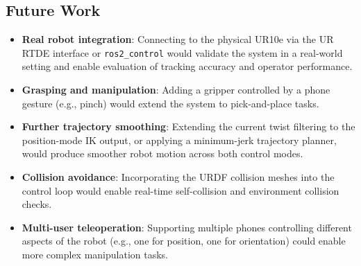 \subsection{Future Work}

\begin{itemize}
    \item \textbf{Real robot integration}: Connecting to the physical UR10e via the UR RTDE interface or \texttt{ros2\_control} would validate the system in a real-world setting and enable evaluation of tracking accuracy and operator performance.

    \item \textbf{Grasping and manipulation}: Adding a gripper controlled by a phone gesture (e.g., pinch) would extend the system to pick-and-place tasks.

    \item \textbf{Further trajectory smoothing}: Extending the current twist filtering to the position-mode IK output, or applying a minimum-jerk trajectory planner, would produce smoother robot motion across both control modes.

    \item \textbf{Collision avoidance}: Incorporating the URDF collision meshes into the control loop would enable real-time self-collision and environment collision checks.

    \item \textbf{Multi-user teleoperation}: Supporting multiple phones controlling different aspects of the robot (e.g., one for position, one for orientation) could enable more complex manipulation tasks.
\end{itemize}
